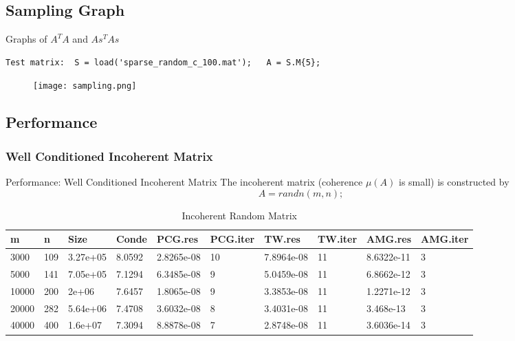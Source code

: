 \subsection{Sampling Graph}
Graphs of $A^T A$ and $As^T As$
\tiny{
\begin{lstlisting}
Test matrix:  S = load('sparse_random_c_100.mat');   A = S.M{5};
\end{lstlisting}}
\begin{figure}[htbp]
    \texttt{[image: sampling.png]}
\end{figure}




\subsection{Performance}
\subsubsection{Well Conditioned Incoherent Matrix}
Performance: Well Conditioned Incoherent Matrix
The incoherent matrix (coherence $\mu(A)$ is small) is constructed by
$$
A = randn(m,n);
$$

\begin{table}\label{table_inc}
\centering
\caption{Incoherent Random Matrix}
\begin{tabular}{| l | l | l |l |l |l |l |l |l |l |}\hline
  m & n & Size  &   Conde    &    PCG.res    &  PCG.iter    &  TW.res    &  TW.iter  &   AMG.res    &  AMG.iter\\\hline
3000& 109 &  3.27e+05  & 8.0592  & 2.8265e-08  & 10  &  7.8964e-08  & 11  & 8.6322e-11 & 3   \\\hline
 5000 & 141 &7.05e+05  & 7.1294 &  6.3485e-08   & 9    & 5.0459e-08   & 11 & 6.8662e-12  & 3  \\\hline
  10000& 200 &   2e+06    & 7.6457   & 1.8065e-08   & 9    & 3.3853e-08   &11 &1.2271e-12   &3 \\\hline
   20000& 282 & 5.64e+06   &7.4708  &  3.6032e-08 &    8   &   3.4031e-08 &   11& 3.468e-13   &3  \\\hline
  40000& 400 &  1.6e+07  &  7.3094 &   8.8878e-08  &   7  &    2.8748e-08  &  11 &  3.6036e-14   & 3  \\\hline
\end{tabular}
\end{table}


